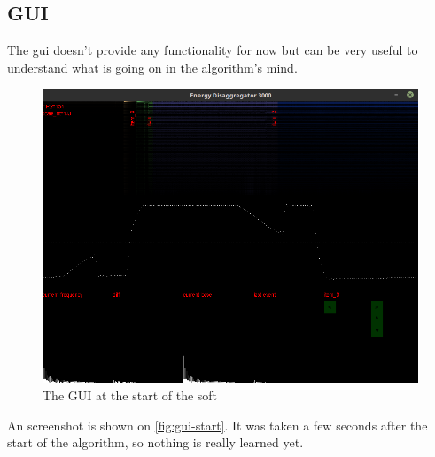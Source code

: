 \subsection{GUI}
The \acrlong{gui} doesn't provide any functionality for now but can be very useful to understand what is going on in the algorithm's mind.
\begin{figure}[t]
    \centering
    \includegraphics[width=\textwidth]{img/gui-start.png}
    \caption{The GUI at the start of the soft}
    \label{fig:gui-start}
\end{figure}
An screenshot is shown on \autoref{fig:gui-start}. It was taken a few seconds after the start of the algorithm, so nothing is really learned yet.

